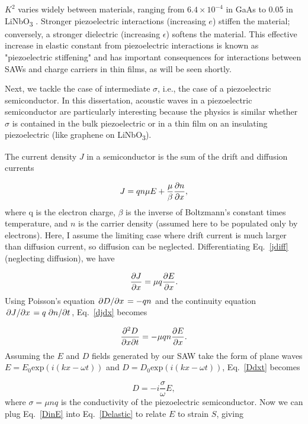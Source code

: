 \documentclass[double,12pt,1in,seploa]{beavtex}
\begin{document}
$K^2$ varies widely between materials, ranging from $6.4 \times 10^{-4}$ in GaAs \cite{wixforth_surface_1989} to 0.05 in LiNbO\textsubscript{3} \cite{warner_determination_1967}. Stronger piezoelectric interactions (increasing $e$) stiffen the material; conversely, a stronger dielectric (increasing $\epsilon$) softens the material. This effective increase in elastic constant from piezoelectric interactions is known as "piezoelectric stiffening" and has important consequences for interactions between SAWs and charge carriers in thin films, as will be seen shortly. 

Next, we tackle the case of intermediate $\sigma$, i.e., the case of a piezoelectric semiconductor. In this dissertation, acoustic waves in a piezoelectric semiconductor are particularly interesting because the physics is similar whether $\sigma$ is contained in the bulk piezoelectric or in a thin film on an insulating piezoelectric (like graphene on LiNbO\textsubscript{3}). 

The current density $J$ in a semiconductor is the sum of the drift and diffusion currents

\begin{equation}
    J = q n \mu E + \frac{\mu}{\beta} \pdv{n}{x}, \label{jdiff}
\end{equation}
where q is the electron charge, $\beta$ is the inverse of Boltzmann's constant times temperature, and $n$ is the carrier density (assumed here to be populated only by electrons). Here, I assume the limiting case where drift current is much larger than diffusion current, so diffusion can be neglected. Differentiating Eq.\ \ref{jdiff} (neglecting diffusion), we have

\begin{equation}
    \pdv{J}{x} = \mu q \pdv{E}{x}. \label{djdx}
\end{equation}
Using Poisson's equation $\pdv*{D}{x} = -qn$ and the continuity equation $\pdv*{J}{x} = q \pdv*{n}{t}$, Eq.\ \ref{djdx} becomes

\begin{equation}
    \pdv{D}{x}{t} = -\mu q n \pdv{E}{x}. \label{Ddxt}
\end{equation}
Assuming the $E$ and $D$ fields generated by our SAW take the form of plane waves $E = E_0 \mathrm{exp}(i(kx - \omega t))$ and $D = D_0 \mathrm{exp}(i(kx - \omega t))$, Eq.\ \ref{Ddxt} becomes

\begin{equation}
    D = -i\frac{\sigma}{\omega} E, \label{DinE}
\end{equation}
where $\sigma = \mu n q$ is the conductivity of the piezoelectric semiconductor. Now we can plug Eq.\ \ref{DinE} into Eq.\ \ref{Delastic} to relate $E$ to strain $S$, giving
\end{document}
